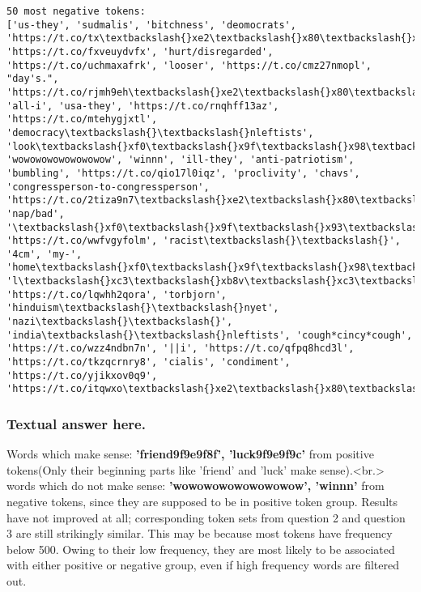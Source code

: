 \documentclass[11pt]{article}
\begin{document}
\begin{Verbatim}[commandchars=\\\{\}]
50 most negative tokens:  
['us-they', 'sudmalis', 'bitchness', 'deomocrats', 'https://t.co/tx\textbackslash{}xe2\textbackslash{}x80\textbackslash{}xa6', 'https://t.co/fxveuydvfx', 'hurt/disregarded', 'https://t.co/uchmaxafrk', 'looser', 'https://t.co/cmz27nmopl', "day's.", 'https://t.co/rjmh9eh\textbackslash{}xe2\textbackslash{}x80\textbackslash{}xa6', 'all-i', 'usa-they', 'https://t.co/rnqhff13az', 'https://t.co/mtehygjxtl', 'democracy\textbackslash{}\textbackslash{}nleftists', 'look\textbackslash{}xf0\textbackslash{}x9f\textbackslash{}x98\textbackslash{}x85', 'wowowowowowowowow', 'winnn', 'ill-they', 'anti-patriotism', 'bumbling', 'https://t.co/qio17l0iqz', 'proclivity', 'chavs', 'congressperson-to-congressperson', 'https://t.co/2tiza9n7\textbackslash{}xe2\textbackslash{}x80\textbackslash{}xa6', 'nap/bad', '\textbackslash{}xf0\textbackslash{}x9f\textbackslash{}x93\textbackslash{}x8csaying', 'https://t.co/wwfvgyfolm', 'racist\textbackslash{}\textbackslash{}', '4cm', 'my-', 'home\textbackslash{}xf0\textbackslash{}x9f\textbackslash{}x98\textbackslash{}xad', 'l\textbackslash{}xc3\textbackslash{}xb8v\textbackslash{}xc3\textbackslash{}xab', 'https://t.co/lqwhh2qora', 'torbjorn', 'hinduism\textbackslash{}\textbackslash{}nyet', 'nazi\textbackslash{}\textbackslash{}', 'india\textbackslash{}\textbackslash{}nleftists', 'cough*cincy*cough', 'https://t.co/wzz4ndbn7n', '||i', 'https://t.co/qfpq8hcd3l', 'https://t.co/tkzqcrnry8', 'cialis', 'condiment', 'https://t.co/yjikxov0q9', 'https://t.co/itqwxo\textbackslash{}xe2\textbackslash{}x80\textbackslash{}xa6']

    \end{Verbatim}

    \subsubsection{Textual answer here.}\label{textual-answer-here.}

    Words which make sense:
\textbf{'friend\x9f\x9e\x9f\x8f\xbd',
'luck\x9f\x9e\x9f\x9c'} from positive tokens(Only their
beginning parts like 'friend' and 'luck' make
sense).\textless{}br.\textgreater{} words which do not make sense:
\textbf{'wowowowowowowowow', 'winnn'} from negative tokens, since they
are supposed to be in positive token group. Results have not improved at
all; corresponding token sets from question 2 and question 3 are still
strikingly similar. This may be because most tokens have frequency below
500. Owing to their low frequency, they are most likely to be associated
with either positive or negative group, even if high frequency words are
filtered out.
\end{document}
